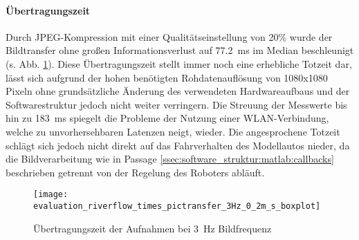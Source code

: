 \paragraph{Übertragungszeit}
Durch JPEG-Kompression mit einer Qualitätseinstellung von 20\% wurde der Bildtransfer ohne großen Informationsverlust auf \SI{77,2}{ms} im Median beschleunigt (s. Abb. \ref{fig:evaluation:riverflow:times_pictransfer_3Hz_0_2m_s_boxplot}). Diese Übertragungszeit stellt immer noch eine erhebliche Totzeit dar, lässt sich aufgrund der hohen benötigten Rohdatenauflösung von 1080x1080 Pixeln ohne grundsätzliche Änderung des verwendeten Hardwareaufbaus und der Softwarestruktur jedoch nicht weiter verringern. Die Streuung der Messwerte bis hin zu \SI{183}{ms} spiegelt die Probleme der Nutzung einer WLAN-Verbindung, welche zu unvorhersehbaren Latenzen neigt, wieder.
Die angesprochene Totzeit schlägt sich jedoch nicht direkt auf das Fahrverhalten des Modellautos nieder, da die Bildverarbeitung wie in Passage \ref{ssec:software_struktur:matlab:callbacks} beschrieben getrennt von der Regelung des Roboters abläuft.

\begin{figure}[htbp] %
\centering
\texttt{[image: evaluation\_riverflow\_times\_pictransfer\_3Hz\_0\_2m\_s\_boxplot]}
\caption{Übertragungszeit der Aufnahmen bei \SI{3}{\hertz} Bildfrequenz}
\label{fig:evaluation:riverflow:times_pictransfer_3Hz_0_2m_s_boxplot}
\end{figure}
